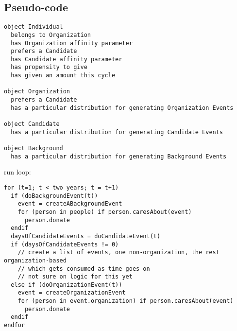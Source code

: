 \documentclass{article}
\begin{document}
\subsection{Pseudo-code}
\begin{verbatim}
object Individual
  belongs to Organization
  has Organization affinity parameter
  prefers a Candidate
  has Candidate affinity parameter
  has propensity to give
  has given an amount this cycle
  
object Organization
  prefers a Candidate
  has a particular distribution for generating Organization Events
  
object Candidate
  has a particular distribution for generating Candidate Events
  
object Background
  has a particular distribution for generating Background Events
\end{verbatim}

run loop:

\begin{verbatim}
for (t=1; t < two years; t = t+1)
  if (doBackgroundEvent(t))
    event = createABackgroundEvent
    for (person in people) if person.caresAbout(event)
      person.donate
  endif
  daysOfCandidateEvents = doCandidateEvent(t)
  if (daysOfCandidateEvents != 0)
    // create a list of events, one non-organization, the rest organization-based
    // which gets consumed as time goes on
    // not sure on logic for this yet
  else if (doOrganizationEvent(t))
    event = createOrganizationEvent
    for (person in event.organization) if person.caresAbout(event)
      person.donate
  endif
endfor
\end{verbatim}


% 
\end{document}
